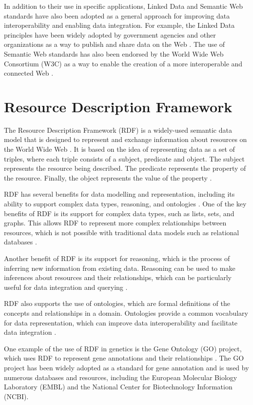 In addition to their use in specific applications, Linked Data and Semantic Web standards have also been adopted as a general approach for improving data interoperability and enabling data integration.  For example, the Linked Data principles have been widely adopted by government agencies and other organizations as a way to publish and share data on the Web \citep*{bizer2011linkedData}.  The use of Semantic Web standards has also been endorsed by the World Wide Web Consortium (W3C) as a way to enable the creation of a more interoperable and connected Web \citep*{shadbolt2006semantic}.

\section{Resource Description Framework}
The Resource Description Framework (RDF) is a widely-used semantic data model that is designed to represent and exchange information about resources on the World Wide Web \citep*{schreiber2014rdf}.  It is based on the idea of representing data as a set of triples, where each triple consists of a subject, predicate and object.  The subject represents the resource being described.  The predicate represents the property of the resource.  Finally, the object represents the value of the property \citep*{schreiber2014rdf}.

RDF has several benefits for data modelling and representation, including its ability to support complex data types, reasoning, and ontologies \citep*{schreiber2014rdf}.  One of the key benefits of RDF is its support for complex data types, such as lists, sets, and graphs.  This allows RDF to represent more complex relationships between resources, which is not possible with traditional data models such as relational databases \citep*{allemang2011semantic}.

Another benefit of RDF is its support for reasoning, which is the process of inferring new information from existing data.  Reasoning can be used to make inferences about resources and their relationships, which can be particularly useful for data integration and querying \citep*{allemang2011semantic}.

RDF also supports the use of ontologies, which are formal definitions of the concepts and relationships in a domain.  Ontologies provide a common vocabulary for data representation, which can improve data interoperability and facilitate data integration \citep*{heath2011linked}.

One example of the use of RDF in genetics is the Gene Ontology (GO) project, which uses RDF to represent gene annotations and their relationships \citep{gene2004gene}.  The GO project has been widely adopted as a standard for gene annotation and is used by numerous databases and resources, including the European Molecular Biology Laboratory (EMBL) and the National Center for Biotechnology Information (NCBI).

